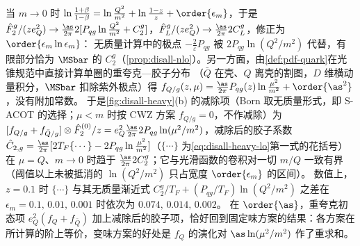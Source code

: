 \begin{example}
当 $m\to0$ 时 $\ln\frac{1+\beta}{1-\beta}=\ln\frac{Q^2}{m^2}+\ln\frac{1-z}z+\order{\epsilon_m}$，于是
$\hat F^g_2/(ze_Q^2)\to\frac{\as}{2\pi}2[P_{qg}\ln\frac{Q^2}{m^2}+C_2^g]$，$\hat F^g_L/(ze_Q^2)\to\frac{\as}{2\pi}2C_L^g$，修正为 $\order{\epsilon_m\ln\epsilon_m}$：
无质量计算中的极点 $-\frac2\varepsilon P_{qg}$ 被 $2P_{qg}\ln(Q^2/m^2)$ 代替，有限部分恰为 $\MSbar$ 的 $C_2^g$（\cref{prop:disall-nlo}）。另一方面，由\cref{def:pdf-quark}在光锥规范中直接计算单圈的重夸克—胶子分布
（$\bar Q$ 在壳、$Q$ 离壳的割图，$D$ 维横动量积分，$\MSbar$ 扣除紫外极点）得 $f_{Q/g}(z,\mu)=\frac{\as}{2\pi}P_{qg}(z)\ln\frac{\mu^2}{m^2}+\order{\as^2}$，没有附加常数。
于是\cref{fig:disall-heavy}(b) 的减除项（Born 取无质量形式，即 S-ACOT 的选择\cite{Kramer:2000hn}；$\mu<m$ 时按 CWZ 方案 $f_{Q/g}=0$，不作减除）为 $[f_{Q/g}+f_{\bar Q/g}]\otimes\hat F^{(0)}_2/z=e_Q^2\frac{\as}{2\pi}2P_{qg}\ln(\mu^2/m^2)$，减除后的胶子系数
$\hat C_{2,g}=\frac{\as}{2\pi}[2T_F\{\cdots\}-2P_{qg}\ln\frac{\mu^2}{m^2}]$（$\{\cdots\}$ 为\cref{eq:disall-heavy-lo}第一式的花括号）在 $\mu=Q$、$m\to0$ 时趋于 $\frac{\as}{2\pi}2C_2^g$；它与光滑函数的卷积对一切 $m/Q$ 一致有界（阈值以上未被抵消的 $\ln(Q^2/m^2)$ 只占宽度 $\order{\epsilon_m}$ 的区间）。
数值上，$z=0.1$ 时 $\{\cdots\}$ 与其无质量渐近式 $C_2^g/T_F+(P_{qg}/T_F)\ln(Q^2/m^2)$ 之差在 $\epsilon_m=0.1,\,0.01,\,0.001$ 时依次为 $0.074,\,0.014,\,0.002$。
在 $\order{\as}$，重夸克初态项 $e_Q^2(f_Q+f_{\bar Q})$ 加上减除后的胶子项，恰好回到固定味方案的结果：各方案在所计算的阶上等价，变味方案的好处是 $f_Q$ 的演化对 $\as\ln(\mu^2/m^2)$ 作了重求和。
\end{example}

